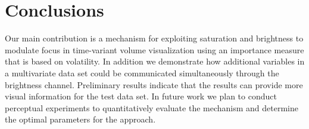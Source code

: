 \section{Conclusions}
Our main contribution is a mechanism for exploiting saturation and brightness to modulate focus in time-variant volume visualization using an importance measure that is based on volatility. In addition we demonstrate how additional variables in a multivariate data set could be communicated simultaneously through the brightness channel. Preliminary results indicate that the results can provide more visual information for the test data set. In future work we plan to conduct perceptual experiments to quantitatively evaluate the mechanism and determine the optimal parameters for the approach.

